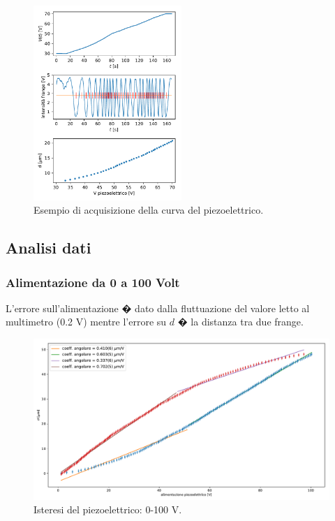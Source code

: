 \documentclass[a4paper]{article}
\begin{document}
\begin{multicols}{2}
\begin{figure}[H]
	\includegraphics[width=0.5\textwidth]{esempio_acquisizione_isteresi.pdf}
	\caption{Esempio di acquisizione della curva del piezoelettrico.}
	\label{fig:esempio_acquisizione_isteresi}
\end{figure}

\subsection{Analisi dati}

\subsubsection{Alimentazione da 0 a 100 Volt}
L'errore sull'alimentazione � dato dalla fluttuazione del valore letto al multimetro (0.2 V) mentre l'errore su $d$ � la distanza tra due frange.

\end{multicols}

\begin{figure}[H]
	\includegraphics[width=1\textwidth]{isteresi_0-100.pdf}
	\caption{Isteresi del piezoelettrico: 0-100 V.}
	\label{fig:0-100}
\end{figure}
\end{document}
